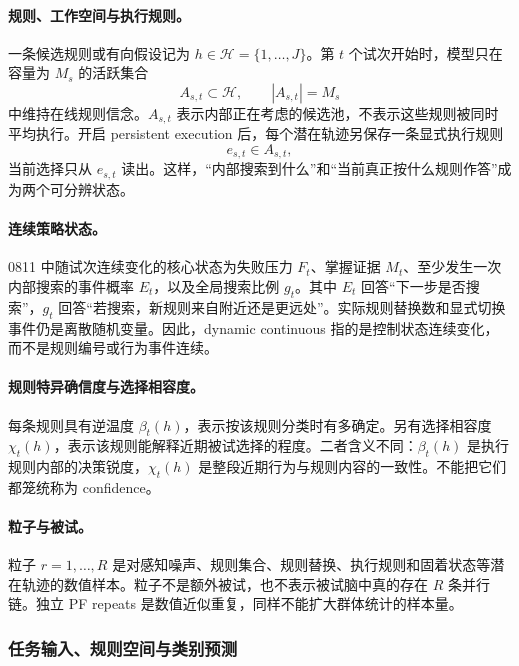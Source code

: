 \paragraph{规则、工作空间与执行规则。}
一条候选规则或有向假设记为 $h\in\mathcal H=\{1,\ldots,J\}$。第 $t$ 个试次开始时，模型只在容量为 $M_s$ 的活跃集合
\begin{equation}
A_{s,t}\subset\mathcal H,
\qquad |A_{s,t}|=M_s
\label{eq:model0811-active-set}
\end{equation}
中维持在线规则信念。$A_{s,t}$ 表示内部正在考虑的候选池，不表示这些规则被同时平均执行。开启 persistent execution 后，每个潜在轨迹另保存一条显式执行规则
\begin{equation}
e_{s,t}\in A_{s,t},
\label{eq:model0811-executed-rule}
\end{equation}
当前选择只从 $e_{s,t}$ 读出。这样，“内部搜索到什么”和“当前真正按什么规则作答”成为两个可分辨状态。

\paragraph{连续策略状态。}
0811 中随试次连续变化的核心状态为失败压力 $F_t$、掌握证据 $M_t$、至少发生一次内部搜索的事件概率 $E_t$，以及全局搜索比例 $g_t$。其中 $E_t$ 回答“下一步是否搜索”，$g_t$ 回答“若搜索，新规则来自附近还是更远处”。实际规则替换数和显式切换事件仍是离散随机变量。因此，dynamic continuous 指的是控制状态连续变化，而不是规则编号或行为事件连续。

\paragraph{规则特异确信度与选择相容度。}
每条规则具有逆温度 $\beta_t(h)$，表示按该规则分类时有多确定。另有选择相容度 $\chi_t(h)$，表示该规则能解释近期被试选择的程度。二者含义不同：$\beta_t(h)$ 是执行规则内部的决策锐度，$\chi_t(h)$ 是整段近期行为与规则内容的一致性。不能把它们都笼统称为 confidence。

\paragraph{粒子与被试。}
粒子 $r=1,\ldots,R$ 是对感知噪声、规则集合、规则替换、执行规则和固着状态等潜在轨迹的数值样本。粒子不是额外被试，也不表示被试脑中真的存在 $R$ 条并行链。独立 PF repeats 是数值近似重复，同样不能扩大群体统计的样本量。


\subsubsection{任务输入、规则空间与类别预测}

